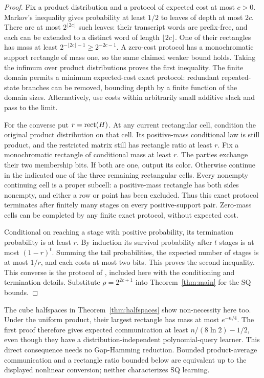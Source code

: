 \begin{proof}
Fix a product distribution and a protocol of expected cost at most $c>0$. Markov's inequality gives probability at least $1/2$ to leaves of depth at most $2c$. There are at most $2^{\lfloor2c\rfloor}$ such leaves: their transcript words are prefix-free, and each can be extended to a distinct word of length $\lfloor2c\rfloor$. One of their rectangles has mass at least $2^{-\lfloor2c\rfloor-1}\ge2^{-2c-1}$. A zero-cost protocol has a monochromatic support rectangle of mass one, so the same claimed weaker bound holds. Taking the infimum over product distributions proves the first inequality. The finite domain permits a minimum expected-cost exact protocol: redundant repeated-state branches can be removed, bounding depth by a finite function of the domain sizes. Alternatively, use costs within arbitrarily small additive slack and pass to the limit.

For the converse put $r=\operatorname{rect}(H)$. At any current rectangular cell, condition the original product distribution on that cell. Its positive-mass conditional law is still product, and the restricted matrix still has rectangle ratio at least $r$. Fix a monochromatic rectangle of conditional mass at least $r$. The parties exchange their two membership bits. If both are one, output its color. Otherwise continue in the indicated one of the three remaining rectangular cells. Every nonempty continuing cell is a proper subcell: a positive-mass rectangle has both sides nonempty, and either a row or point has been excluded. Thus this exact protocol terminates after finitely many stages on every positive-support pair. Zero-mass cells can be completed by any finite exact protocol, without expected cost.

Conditional on reaching a stage with positive probability, its termination probability is at least $r$. By induction its survival probability after $t$ stages is at most $(1-r)^t$. Summing the tail probabilities, the expected number of stages is at most $1/r$, and each costs at most two bits. This proves the second inequality. This converse is the protocol of \citet[Proposition~3.14]{HHPTZ22}, included here with the conditioning and termination details. Substitute $\rho=2^{2c+1}$ into Theorem~\ref{thm:main} for the SQ bounds.
\end{proof}

The cube halfspaces in Theorem~\ref{thm:halfspaces} show non-necessity here too. Under the uniform product, their largest rectangle has mass at most $e^{-n/4}$. The first proof therefore gives expected communication at least $n/(8\ln2)-1/2$, even though they have a distribution-independent polynomial-query learner. This direct consequence needs no Gap-Hamming reduction. Bounded product-average communication and a rectangle ratio bounded below are equivalent up to the displayed nonlinear conversion; neither characterizes SQ learning.
